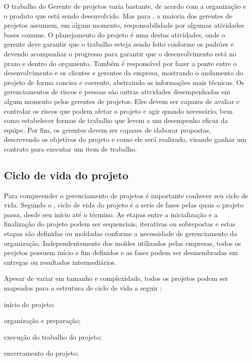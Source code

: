\documentclass[
    12pt,               %
    openright,          %
    twoside,            %
    a4paper,            %
    chapter=TITLE,     %
    english,            %
    spanish,            %
    portuguese              %
    ]{abntex2}
\begin{document}
O trabalho do Gerente de projetos varia bastante, de acordo com a organização e o produto que está sendo desenvolvido. Mas para , a maioria dos gerentes de projetos assumem, em algum momento, responsabilidade por algumas atividades bases comuns. O planejamento do projeto é uma destas atividades, onde o gerente deve garantir que o trabalho esteja sendo feito conforme os padrões e devendo acompanhar o progresso para garantir que o desenvolvimento está no prazo e dentro do orçamento. Também é responsável por fazer a ponte entre o desenvolvimento e os clientes e gerentes da empresa, mostrando o andamento do projeto de forma concisa e coerente, abstraindo as informações mais técnicas. Os gerenciamentos de riscos e pessoas são outras atividades desempenhadas em algum momento pelos gerentes de projetos. Eles devem ser capazes de avaliar e controlar os riscos que podem afetar o projeto e agir quando necessário, bem como estabelecer formas de trabalho que levem a um desempenho eficaz da equipe. Por fim, os gerentes devem ser capazes de elaborar propostas, descrevendo os objetivos do projeto e como ele será realizado, visando ganhar um contrato para executar um item de trabalho.

\subsection{Ciclo de vida do projeto}
Para compreender o gerenciamento de projetos é importante conhecer seu ciclo de vida. Segundo o , ciclo de vida do projeto é a serie de fases pelas quais o projeto passa, desde seu início até o término. As etapas entre a inicialização e a finalização do projeto podem ser sequenciais, iterativas ou sobrepostas e estas etapas são definidas ou moldadas conforme a necessidade de gerenciamento da organização. Independentemente dos moldes utilizados pelas empresas, todos os projetos possuem início e fim definidos e as fases podem ser desmembradas em entregas ou resultados intermediários.

Apesar de variar em tamanho e complexidade, todos os projetos podem ser mapeados para a estrutura de ciclo de vida a seguir \cite[p.~39]{pmi2013}:

\begin{alineas}
	\item início do projeto;
	\item organização e preparação;
	\item execução do trabalho do projeto;
	\item encerramento do projeto;
\end{alineas}
\end{document}
